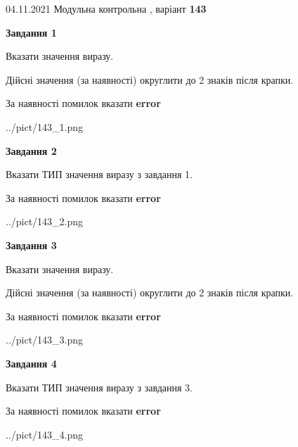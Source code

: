 \documentclass[11pt, ukrainian]{article}
\begin{document}
{04.11.2021 Модульна контрольна , варіант  \No \textbf { 143 }\par}
{
\begin {large}
{\begin {center}\textbf{Завдання 1}\end {center}}\par
Вказати значення виразу. \par
Дійсні значення (за наявності) округлити до 2 знаків після крапки. \par
За наявності помилок вказати \textbf{error}

\begin{center}
	{../pict/143_1.png}
\end{center}
\newpage

{\begin {center}\textbf{Завдання 2}\end {center}}\par
Вказати ТИП значення виразу з завдання 1. \par
За наявності помилок вказати \textbf{error}

\begin{center}
	{../pict/143_2.png}
\end{center}
\newpage

{\begin {center}\textbf{Завдання 3}\end {center}}\par
Вказати значення виразу. \par
Дійсні значення (за наявності) округлити до 2 знаків після крапки. \par
За наявності помилок вказати \textbf{error}

\begin{center}
	{../pict/143_3.png}
\end{center}
\newpage

{\begin {center}\textbf{Завдання 4}\end {center}}\par
Вказати ТИП значення виразу з завдання 3. \par
За наявності помилок вказати \textbf{error}

\begin{center}
	{../pict/143_4.png}
\end{center}
\newpage


\end{large}}
\end{document}
